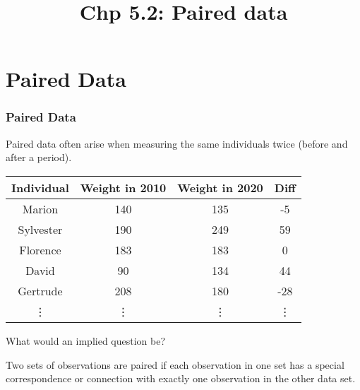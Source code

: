 \documentclass[11pt,containsverbatim,handout]{beamer}
\title[Chp 5.2: Paired data]{Chp 5.2: Paired data}
\newcommand{\soln}[1]{ }
\begin{document}
\section{Paired Data}
\begin{frame}
\frametitle{Paired Data}
Paired data often arise when measuring the same individuals twice (before and after a period). \pause
\begin{center}
\begin{tabular}{|c|c|c|c|} \hline
Individual & Weight in 2010 & Weight in 2020 & Diff \\ \hline
Marion & 140 & 135 & -5\\
Sylvester & 190 & 249 & 59\\
Florence & 183 & 183 & 0\\
David & 90  & 134 & 44\\
Gertrude & 208 & 180 & -28\\
\vdots&\vdots&\vdots & \vdots \\ \hline
\end{tabular}
\end{center}
What would an implied question be? \pause
\begin{center}
\soln{Do individual humans tend to gain weight over time?}
\vfill
\end{center} \pause
Two sets of observations are paired if each observation in one set has a special correspondence or connection with exactly one observation in the other data set.
\end{frame}
\end{document}
